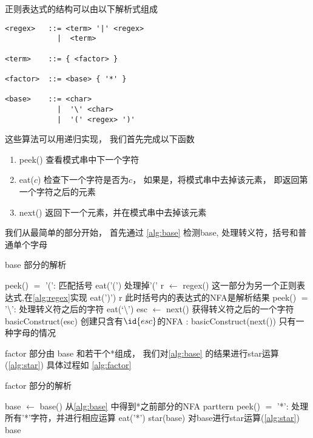 \documentclass[../report]{subfiles}
\begin{document}
正则表达式的结构可以由以下解析式组成

\begin{lstlisting}[numbers=none]
<regex>   ::= <term> '|' <regex>
            |  <term>

<term>    ::= { <factor> }

<factor>  ::= <base> { '*' }

<base>    ::= <char>
            |  '\' <char>
            |  '(' <regex> ')'
\end{lstlisting}

这些算法可以用递归实现，
我们首先完成以下函数
\begin{enumerate}
  \item peek() 查看模式串中下一个字符
  \item eat($c$) 检查下一个字符是否为$c$，
    如果是，将模式串中去掉该元素，
    即返回第一个字符之后的元素
  \item next() 返回下一个元素，并在模式串中去掉该元素
\end{enumerate}

我们从最简单的部分开始，
首先通过%
\cref{alg:base}
检测base,
处理转义符，括号和普通单个字母

\begin{algorithm}[H]
  \caption{base 部分的解析}
  \begin{codebox}
      \li \If peek() $=$ '(':  \Comment[2] 匹配括号
      \Then
        \li eat('(') \Comment[3.5] 处理掉'('
        \li r $\gets$ regex() \Comment[1.5] 这一部分为另一个正则表达式,在\cref{alg:regex}实现
        \li eat(')')
        \li \Return r \Comment[3] 此时括号内的表达式的NFA是解析结果
      \End
      \li \Else \If peek() $=$ '\textbackslash': \Comment[2] 处理转义符之后的字符
      \Then
        \li eat(‘\textbackslash’)
        \li esc $\gets$ next() \Comment[3.5] 获得转义符之后的一个字符
        \li \Return basicConstruct(esc) \Comment[1] 创建只含有$\id{esc}$的NFA
      \End
      \li \Else:
      \Then
        \li \Return basicConstruct(next()) \Comment[1] 只有一种字母的情况
      \End
  \end{codebox}
  \label{alg:base}
\end{algorithm}

factor 部分由
base 和若干个*组成，
我们对\cref{alg:base}
的结果进行star运算(\cref{alg:star})
具体过程如%
\cref{alg:factor}

\begin{algorithm}[H]
  \caption{factor 部分的解析}
  \begin{codebox}
      \li base $\gets$ base() \Comment[1] 从\cref{alg:base} 中得到*之前部分的NFA
      \li \While parttern  peek() $=$ '*':
        \Comment[1] 处理所有'*'字符，并进行相应运算
      \Then
        \li eat('*')
        \li star(base)
          \Comment[1]  对base进行star运算(\cref{alg:star})
      \End
      \li \Return base
  \end{codebox}
  \label{alg:factor}
\end{algorithm}
\end{document}
